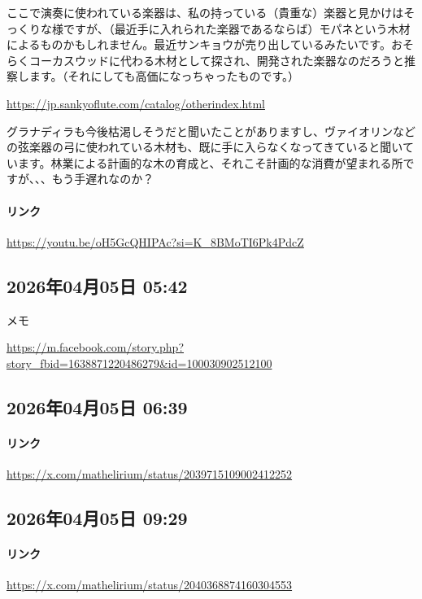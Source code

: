 ここで演奏に使われている楽器は、私の持っている（貴重な）楽器と見かけはそっくりな様ですが、（最近手に入れられた楽器であるならば）モパネという木材によるものかもしれません。最近サンキョウが売り出しているみたいです。おそらくコーカスウッドに代わる木材として探され、開発された楽器なのだろうと推察します。（それにしても高価になっちゃったものです。）

\url{https://jp.sankyoflute.com/catalog/otherindex.html}

グラナディラも今後枯渇しそうだと聞いたことがありますし、ヴァイオリンなどの弦楽器の弓に使われている木材も、既に手に入らなくなってきていると聞いています。林業による計画的な木の育成と、それこそ計画的な消費が望まれる所ですが、、、もう手遅れなのか？

\paragraph{リンク}
\url{https://youtu.be/oH5GcQHIPAc?si=K_8BMoTI6Pk4PdcZ}

\subsection*{2026年04月05日 05:42}

メモ

\url{https://m.facebook.com/story.php?story_fbid=1638871220486279&id=100030902512100}

\subsection*{2026年04月05日 06:39}

\paragraph{リンク}
\url{https://x.com/mathelirium/status/2039715109002412252}

\subsection*{2026年04月05日 09:29}

\paragraph{リンク}
\url{https://x.com/mathelirium/status/2040368874160304553}

